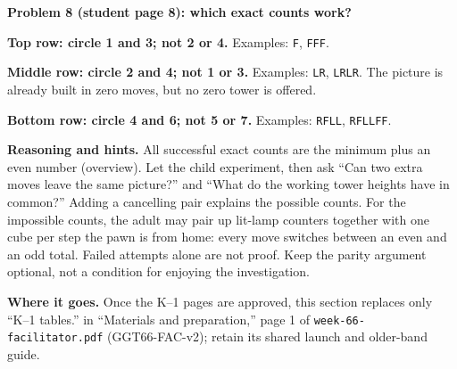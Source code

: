 \documentclass[11pt]{article}
\newcommand{\sub}[1]{\par\textbf{#1}\par}
\newcommand{\exactword}[2]{\texttt{#2}}
\begin{document}
\sub{Problem 8 (student page 8): which exact counts work?}
\textbf{Top row: circle 1 and 3; not 2 or 4.} Examples: \exactword{8top}{F}, \exactword{8top}{FFF}.\par
\textbf{Middle row: circle 2 and 4; not 1 or 3.} Examples: \exactword{8middle}{LR}, \exactword{8middle}{LRLR}. The picture is already built in zero moves, but no zero tower is offered.\par
\textbf{Bottom row: circle 4 and 6; not 5 or 7.} Examples: \exactword{8bottom}{RFLL}, \exactword{8bottom}{RFLLFF}.

\textbf{Reasoning and hints.} All successful exact counts are the minimum plus an even number (overview). Let the child experiment, then ask ``Can two extra moves leave the same picture?'' and ``What do the working tower heights have in common?'' Adding a cancelling pair explains the possible counts. For the impossible counts, the adult may pair up lit-lamp counters together with one cube per step the pawn is from home: every move switches between an even and an odd total. Failed attempts alone are not proof. Keep the parity argument optional, not a condition for enjoying the investigation.

\textbf{Where it goes.} Once the K--1 pages are approved, this section replaces only ``K--1 tables.'' in ``Materials and preparation,'' page 1 of \texttt{week-66-facilitator.pdf} (GGT66-FAC-v2); retain its shared launch and older-band guide.
\end{document}
